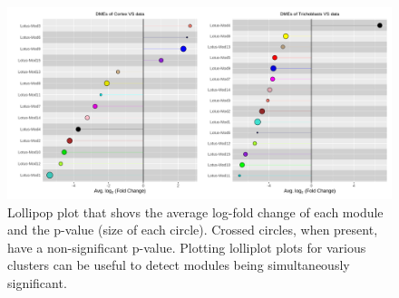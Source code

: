 \documentclass[
  letterpaper,
  DIV=11,
  numbers=noendperiod]{scrartcl}
\begin{document}
\begin{figure}[H]

{\centering \includegraphics{notebook_files/figure-pdf/fig-lol2-output-2.png}

}

\caption{\label{fig-lol2}Lollipop plot that shovs the average log-fold
change of each module and the p-value (size of each circle). Crossed
circles, when present, have a non-significant p-value. Plotting
lolliplot plots for various clusters can be useful to detect modules
being simultaneously significant.}

\end{figure}
\end{document}
